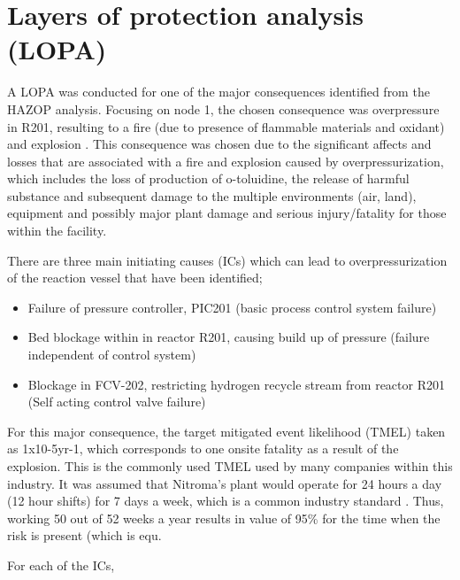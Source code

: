 \section{Layers of protection analysis (LOPA)}

A LOPA was conducted for one of the major consequences identified from the HAZOP analysis. Focusing on node 1, the chosen consequence was overpressure in R201, resulting to a fire (due to presence of flammable materials and oxidant) and explosion . This consequence was chosen due to the significant affects and losses that are associated with a fire and explosion caused by overpressurization, which includes the loss of production of o-toluidine, the release of harmful substance and subsequent damage to the multiple environments (air, land), equipment and possibly major plant damage and serious injury/fatality for those within the facility. 

There are three main initiating causes (ICs) which can lead to overpressurization of the reaction vessel that have been identified;

\begin{itemize}
\item Failure of pressure controller, PIC201 (basic process control system failure)
\item Bed blockage within in reactor R201, causing build up of pressure (failure independent of control system)
\item Blockage in FCV-202, restricting hydrogen recycle stream from reactor R201 (Self acting control valve failure)

\end{itemize}
 For this major consequence, the target mitigated event likelihood (TMEL) taken as 1x10-5yr-1, which corresponds to one onsite fatality as a result of the explosion. This is the commonly used TMEL used by many companies within this industry. It was assumed that Nitroma's plant would operate for 24 hours a day (12 hour shifts) for 7 days a week, which is a common industry standard \cite{job_guide_chemical_2021}. Thus, working 50 out of 52 weeks a year results in value of 95\% for the time when the risk is present (which is equ.  
 
 
 For each of the ICs, 








 